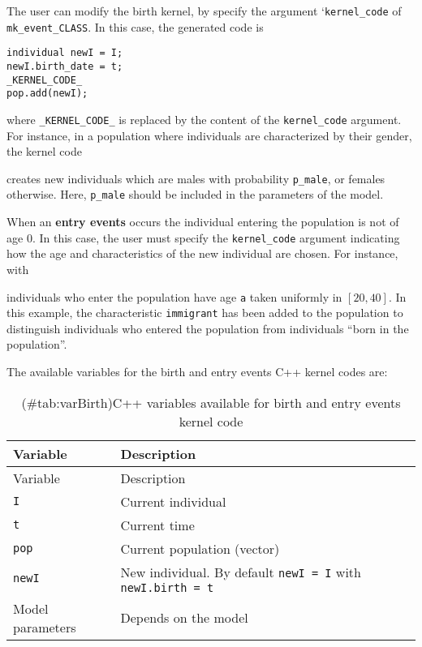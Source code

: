 The user can modify the birth kernel, by specify the argument `\texttt{kernel\_code} of \texttt{mk\_event\_CLASS}. In this case, the generated code is

\begin{verbatim}
individual newI = I;   
newI.birth_date = t;  
_KERNEL_CODE_
pop.add(newI);
\end{verbatim}

where \texttt{\_KERNEL\_CODE\_} is replaced by the content of the \texttt{kernel\_code} argument. For instance, in a population where individuals are characterized by their gender, the kernel code

\begin{Shaded}
\begin{Highlighting}[]
\end{Highlighting}
\end{Shaded}

creates new individuals which are males with probability \texttt{p\_male}, or females otherwise. Here, \texttt{p\_male} should be included in the parameters of the model.

When an \textbf{entry events} occurs the individual entering the population is not of age \(0\). In this case, the user must specify the \texttt{kernel\_code} argument indicating how the age and characteristics of the new individual are chosen. For instance, with

\begin{Shaded}
\begin{Highlighting}[]
\end{Highlighting}
\end{Shaded}

individuals who enter the population have age \texttt{a} taken uniformly in \([20,40]\). In this example, the characteristic \texttt{immigrant} has been added to the population to distinguish individuals who entered the population from individuals ``born in the population''.

The available variables for the birth and entry events C++ kernel codes are:

\begin{longtable}[]{@{}ll@{}}
\caption{(\#tab:varBirth)C++ variables available for birth and entry events kernel code}\tabularnewline
\toprule
Variable & Description\tabularnewline
\midrule
\endfirsthead
\toprule
Variable & Description\tabularnewline
\midrule
\endhead
\texttt{I} & Current individual\tabularnewline
\texttt{t} & Current time\tabularnewline
\texttt{pop} & Current population (vector)\tabularnewline
\texttt{newI} & New individual. By default \texttt{newI\ =\ I} with \texttt{newI.birth\ =\ t}\tabularnewline
Model parameters & Depends on the model\tabularnewline
\bottomrule
\end{longtable}

